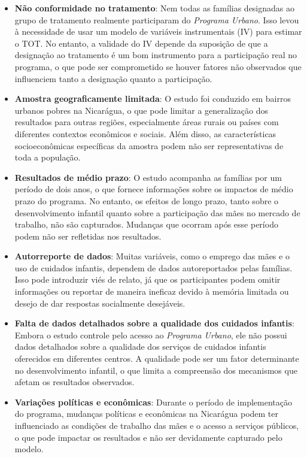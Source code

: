 \documentclass[a4paper,12pt]{article}[abntex2]
\begin{document}
\begin{itemize}
    \item \textbf{Não conformidade no tratamento}: Nem todas as famílias designadas ao grupo de tratamento realmente participaram do \textit{Programa Urbano}. Isso levou à necessidade de usar um modelo de variáveis instrumentais (IV) para estimar o TOT. No entanto, a validade do IV depende da suposição de que a designação ao tratamento é um bom instrumento para a participação real no programa, o que pode ser comprometido se houver fatores não observados que influenciem tanto a designação quanto a participação.
    
    \item \textbf{Amostra geograficamente limitada}: O estudo foi conduzido em bairros urbanos pobres na Nicarágua, o que pode limitar a generalização dos resultados para outras regiões, especialmente áreas rurais ou países com diferentes contextos econômicos e sociais. Além disso, as características socioeconômicas específicas da amostra podem não ser representativas de toda a população.
    
    \item \textbf{Resultados de médio prazo}: O estudo acompanha as famílias por um período de dois anos, o que fornece informações sobre os impactos de médio prazo do programa. No entanto, os efeitos de longo prazo, tanto sobre o desenvolvimento infantil quanto sobre a participação das mães no mercado de trabalho, não são capturados. Mudanças que ocorram após esse período podem não ser refletidas nos resultados.
    
    \item \textbf{Autorreporte de dados}: Muitas variáveis, como o emprego das mães e o uso de cuidados infantis, dependem de dados autoreportados pelas famílias. Isso pode introduzir viés de relato, já que os participantes podem omitir informações ou reportar de maneira ineficaz devido à memória limitada ou desejo de dar respostas socialmente desejáveis.
    
    \item \textbf{Falta de dados detalhados sobre a qualidade dos cuidados infantis}: Embora o estudo controle pelo acesso ao \textit{Programa Urbano}, ele não possui dados detalhados sobre a qualidade dos serviços de cuidados infantis oferecidos em diferentes centros. A qualidade pode ser um fator determinante no desenvolvimento infantil, o que limita a compreensão dos mecanismos que afetam os resultados observados.
    
    \item \textbf{Variações políticas e econômicas}: Durante o período de implementação do programa, mudanças políticas e econômicas na Nicarágua podem ter influenciado as condições de trabalho das mães e o acesso a serviços públicos, o que pode impactar os resultados e não ser devidamente capturado pelo modelo.
\end{itemize}
\end{document}
